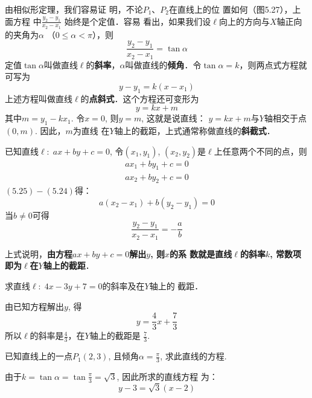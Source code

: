 由相似形定理，我们容易证
明，不论$P_1$、$P_2$在直线上的位
置如何（图5.27），上面方程
中$\frac{y_2-y_1}{x_2-x_1}$
始终是个定值．容易
看出，如果我们设$\ell$向上的方向与$X$轴正向的夹角为$\alpha$
（$0\le \alpha< \pi$），则
\[\frac{y_2-y_1}{x_2-x_1}=\tan\alpha\]
定值$\tan\alpha$叫做直线$\ell$的\textbf{斜率}，$\alpha$叫做直线的\textbf{倾角}．令$\tan\alpha=k$，则两点式方程就可写为
\[y-y_1=k(x-x_1)\]
上述方程叫做直线$\ell$的\textbf{点斜式}．这个方程还可变形为
\[y=kx+m\]
其中$m=y_1-kx_1$. 令$x=0$, 则$y=m$, 这就是说直线：
$y=kx+m$与$Y$轴相交于点$(0,m)$. 因此，$m$为直线
在$Y$轴上的截距，上式通常称做直线的\textbf{斜截式}．

已知直线$\ell:\; ax+by+c=0$, 令$(x_1,y_1)$, 
$(x_2,y_2)$是$\ell$上任意两个不同的点，则
\begin{align}
    ax_1+by_1+c=0\\
ax_2+by_2+c=0
\end{align}
$(5.25)-(5.24)$得：
\[a(x_2-x_1)+b(y_2-y_1)=0\]
当$b\ne 0$可得
\[\frac{y_2-y_1}{x_2-x_1}=-\frac{a}{b}\]

上式说明，\textbf{由方程$ax+by+c=0$解出$y$, 则$x$的系
数就是直线$\ell$的斜率$k$, 常数项即为$\ell$在$Y$轴上的截距}．

\begin{example}
    求直线$\ell:\; 4x-3y+7=0$的斜率及在$Y$轴上的
截距．
\end{example}


\begin{solution}
   由已知方程解出$y$, 得
\[y=\frac{4}{3}x+\frac{7}{3}\]
所以$\ell$的斜率是$\frac{4}{3}$，在$Y$轴上的截距是
$\frac{7}{3}$.
\end{solution}

\begin{example}
已知直线上的一点$P_1(2,3)$, 且倾角$\alpha=\frac{\pi}{3}$, 
求此直线的方程.
\end{example}

\begin{solution}
    由于$k=\tan\alpha=\tan\frac{\pi}{3}=\sqrt{3}$, 因此所求的直线方程
为：
\[y-3=\sqrt{3}(x-2)\]
\end{solution}

